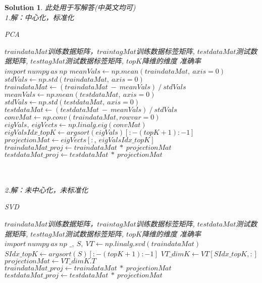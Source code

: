 \documentclass[a4paper,UTF8]{article}
\numberwithin{equation}{section}
\newtheorem*{solution}{Solution}
\begin{document}
\begin{solution}
	此处用于写解答(中英文均可)\\
\newpage
\noindent
1.解：中心化，标准化
\begin{algorithm}  
	\caption{PCA}  
	\begin{algorithmic}[1] %
		\Require $traindataMat$训练数据矩阵，$traintagMat$训练数据标签矩阵, $testdataMat$测试数据矩阵, $testtagMat$测试数据标签矩阵, $topK$降维的维度  
		\Ensure 准确率  
		\State $import\ numpy\ as\ np$
		\State $meanVals \gets np.mean(traindataMat,\ axis=0)$
		\State $stdVals \gets np.std(traindataMat,\ axis=0)$
		\State $traindataMat \gets (traindataMat\ -\ meanVals)\ /\ stdVals$
		\State $meanVals \gets np.mean(testdataMat,\ axis=0)$
		\State $stdVals \gets np.std(testdataMat,\ axis=0)$
		\State $testdataMat \gets (testdataMat\ -\ meanVals)\ /\ stdVals$
		\State $convMat \gets np.conv(traindataMat, rowvar=0)$
		\State $eigVals,\ eigVects \gets np.linalg.eig(convMat)$
		\State $eigValsIdx\_topK \gets argsort(eigVals)[:-(topK+1):-1]$
		\State $projectionMat \gets eigVects[:,\ eigValsIdx\_topK]$
		\State $traindataMat\_proj \gets traindataMat\ *\ projectionMat$
		\State $testdataMat\_proj \gets testdataMat\ *\ projectionMat$
		\State {}
	\end{algorithmic}  
\end{algorithm}
\\\\
2.解：未中心化，未标准化
\begin{algorithm}
	\caption{SVD}
	\begin{algorithmic}[1]
		\Require $traindataMat$训练数据矩阵，$traintagMat$训练数据标签矩阵, $testdataMat$测试数据矩阵, $testtagMat$测试数据标签矩阵, $topK$降维的维度
		\Ensure 准确率
		\State $import\ numpy\ as\ np$
		\State $\_,\ S,\ VT \gets np.linalg.svd(traindataMat)$
		\State $SIdx\_topK \gets argsort(S)[:-(topK+1):-1]$
		\State $VT\_dimK \gets VT[SIdx\_topK,:]$
        \State $projectionMat \gets VT\_dimK.T$
        \State $traindataMat\_proj \gets traindataMat\ *\ projectionMat$
		\State $testdataMat\_proj \gets testdataMat\ *\ projectionMat$
		\State {}
	\end{algorithmic}
\end{algorithm}


\end{solution}
\end{document}
